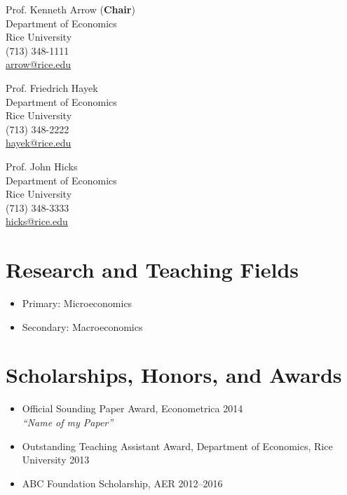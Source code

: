 \documentclass{article}[12]
\begin{document}
\begin{minipage}[t]{0.280\textwidth}
Prof. Kenneth Arrow (\textbf{Chair}) \\
Department of Economics \\
Rice University \\
(713) 348-1111\\
\href{mailto:arrow@rice.edu}{arrow@rice.edu}
\end{minipage} %
%
\hfill
%
\begin{minipage}[t]{0.255\textwidth}
Prof. Friedrich Hayek \\
Department of Economics \\
Rice University \\
(713) 348-2222\\
\href{mailto:hayek@rice.edu}{hayek@rice.edu}
\end{minipage}%
%
\hfill
%
\begin{minipage}[t]{0.255\textwidth}
Prof. John Hicks \\
Department of Economics\\
Rice University \\
(713) 348-3333 \\
\href{mailto:hicks@rice.edu}{hicks@rice.edu}
\end{minipage}


\section{Research and Teaching Fields}

\begin{itemize}
    \item Primary: Microeconomics 
    \item Secondary: Macroeconomics 
\end{itemize}


\section{Scholarships, Honors, and Awards}

\begin{itemize}
    \item Official Sounding Paper Award, Econometrica \hfill 2014 \\
    \emph{``Name of my Paper''}
    
    \item Outstanding Teaching Assistant Award, Department of Economics, Rice University \hfill 2013

    \item ABC Foundation Scholarship, AER \hfill 2012--2016
\end{itemize}
\end{document}
